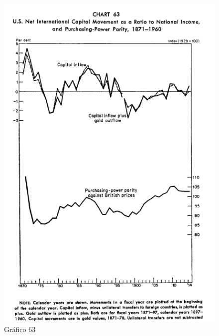 \documentclass[12pt]{article}
\begin{document}
\begin{figure}[H]
    \centering
    \caption{Gráfico 63}
    \includegraphics[width=1.0\textwidth]{4º Período/História do Pensamento Econômico/Tradução HPE/Tradução Tópico 9.1/Gráfico 63.png}
    \end{figure}
\end{document}
